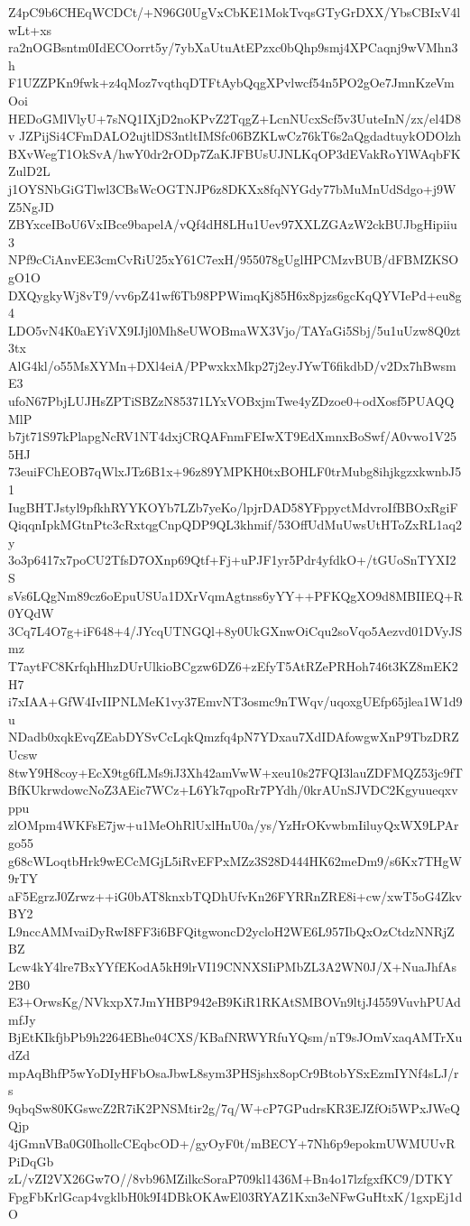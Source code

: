 Z4pC9b6CHEqWCDCt/+N96G0UgVxCbKE1MokTvqsGTyGrDXX/YbsCBIxV4lwLt+xs
ra2nOGBsntm0IdECOorrt5y/7ybXaUtuAtEPzxc0bQhp9smj4XPCaqnj9wVMhn3h
F1UZZPKn9fwk+z4qMoz7vqthqDTFtAybQqgXPvlwcf54n5PO2gOe7JmnKzeVmOoi
HEDoGMlVlyU+7sNQ1IXjD2noKPvZ2TqgZ+LcnNUcxScf5v3UuteInN/zx/el4D8v
JZPijSi4CFmDALO2ujtlDS3ntltIMSfc06BZKLwCz76kT6s2aQgdadtuykODOlzh
BXvWegT1OkSvA/hwY0dr2rODp7ZaKJFBUsUJNLKqOP3dEVakRoYlWAqbFKZulD2L
j1OYSNbGiGTlwl3CBsWcOGTNJP6z8DKXx8fqNYGdy77bMuMnUdSdgo+j9WZ5NgJD
ZBYxceIBoU6VxIBce9bapelA/vQf4dH8LHu1Uev97XXLZGAzW2ckBUJbgHipiiu3
NPf9cCiAnvEE3cmCvRiU25xY61C7exH/955078gUglHPCMzvBUB/dFBMZKSOgO1O
DXQygkyWj8vT9/vv6pZ41wf6Tb98PPWimqKj85H6x8pjzs6gcKqQYVIePd+eu8g4
LDO5vN4K0aEYiVX9IJjl0Mh8eUWOBmaWX3Vjo/TAYaGi5Sbj/5u1uUzw8Q0zt3tx
AlG4kl/o55MsXYMn+DXl4eiA/PPwxkxMkp27j2eyJYwT6fikdbD/v2Dx7hBwsmE3
ufoN67PbjLUJHsZPTiSBZzN85371LYxVOBxjmTwe4yZDzoe0+odXosf5PUAQQMlP
b7jt71S97kPlapgNcRV1NT4dxjCRQAFnmFEIwXT9EdXmnxBoSwf/A0vwo1V255HJ
73euiFChEOB7qWlxJTz6B1x+96z89YMPKH0txBOHLF0trMubg8ihjkgzxkwnbJ51
IugBHTJstyl9pfkhRYYKOYb7LZb7yeKo/lpjrDAD58YFppyctMdvroIfBBOxRgiF
QiqqnIpkMGtnPtc3cRxtqgCnpQDP9QL3khmif/53OffUdMuUwsUtHToZxRL1aq2y
3o3p6417x7poCU2TfsD7OXnp69Qtf+Fj+uPJF1yr5Pdr4yfdkO+/tGUoSnTYXI2S
sVs6LQgNm89cz6oEpuUSUa1DXrVqmAgtnss6yYY++PFKQgXO9d8MBIIEQ+R0YQdW
3Cq7L4O7g+iF648+4/JYcqUTNGQl+8y0UkGXnwOiCqu2soVqo5Aezvd01DVyJSmz
T7aytFC8KrfqhHhzDUrUlkioBCgzw6DZ6+zEfyT5AtRZePRHoh746t3KZ8mEK2H7
i7xIAA+GfW4IvIIPNLMeK1vy37EmvNT3osmc9nTWqv/uqoxgUEfp65jlea1W1d9u
NDadb0xqkEvqZEabDYSvCcLqkQmzfq4pN7YDxau7XdIDAfowgwXnP9TbzDRZUcsw
8twY9H8coy+EcX9tg6fLMs9iJ3Xh42amVwW+xeu10s27FQI3lauZDFMQZ53jc9fT
BfKUkrwdowcNoZ3AEic7WCz+L6Yk7qpoRr7PYdh/0krAUnSJVDC2Kgyuueqxvppu
zlOMpm4WKFsE7jw+u1MeOhRlUxlHnU0a/ys/YzHrOKvwbmIiluyQxWX9LPArgo55
g68cWLoqtbHrk9wECcMGjL5iRvEFPxMZz3S28D444HK62meDm9/s6Kx7THgW9rTY
aF5EgrzJ0Zrwz++iG0bAT8knxbTQDhUfvKn26FYRRnZRE8i+cw/xwT5oG4ZkvBY2
L9nccAMMvaiDyRwI8FF3i6BFQitgwoncD2ycloH2WE6L957IbQxOzCtdzNNRjZBZ
Lcw4kY4lre7BxYYfEKodA5kH9lrVI19CNNXSIiPMbZL3A2WN0J/X+NuaJhfAs2B0
E3+OrwsKg/NVkxpX7JmYHBP942eB9KiR1RKAtSMBOVn9ltjJ4559VuvhPUAdmfJy
BjEtKIkfjbPb9h2264EBhe04CXS/KBafNRWYRfuYQsm/nT9sJOmVxaqAMTrXudZd
mpAqBhfP5wYoDIyHFbOsaJbwL8sym3PHSjshx8opCr9BtobYSxEzmIYNf4sLJ/rs
9qbqSw80KGswcZ2R7iK2PNSMtir2g/7q/W+cP7GPudrsKR3EJZfOi5WPxJWeQQjp
4jGmnVBa0G0IhollcCEqbcOD+/gyOyF0t/mBECY+7Nh6p9epokmUWMUUvRPiDqGb
zL/vZI2VX26Gw7O//8vb96MZilkcSoraP709kl1436M+Bn4o17lzfgxfKC9/DTKY
FpgFbKrlGcap4vgklbH0k9I4DBkOKAwEl03RYAZ1Kxn3eNFwGuHtxK/1gxpEj1dO
